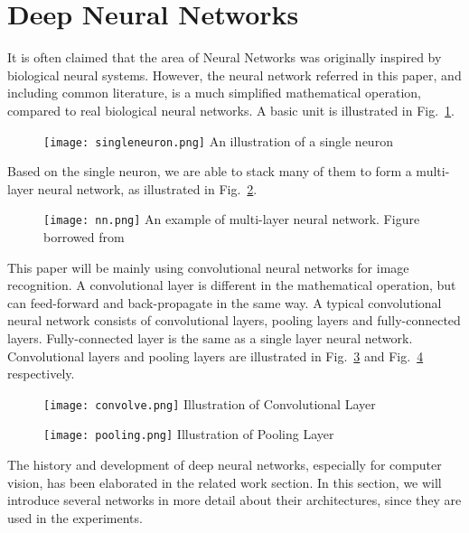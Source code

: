 \section{Deep Neural Networks}
It is often claimed that the area of Neural Networks was originally inspired by biological neural systems. However, the neural network referred in this paper, and including common literature, is a much simplified mathematical operation, compared to real biological neural networks. A basic unit is illustrated in Fig.~\ref{fig:singleneuron}.
\begin{figure}[!htp]
	\centering
	\texttt{[image: singleneuron.png]}
	{An illustration of a single neuron}
	\label{fig:singleneuron}
\end{figure}
Based on the single neuron, we are able to stack many of them to form a multi-layer neural network, as illustrated in Fig.~\ref{fig:nn}.
\begin{figure}[!htp]
	\centering
	\texttt{[image: nn.png]}
	{An example of multi-layer neural network. Figure borrowed from \parencite{lecun2015deep}}
	\label{fig:nn}
\end{figure}
This paper will be mainly using convolutional neural networks for image recognition. A convolutional layer is different in the mathematical operation, but can feed-forward and back-propagate in the same way. A typical convolutional neural network consists of convolutional layers, pooling layers and fully-connected layers. Fully-connected layer is the same as a single layer neural network. Convolutional layers and pooling layers are illustrated in Fig.~\ref{fig:convolve} and Fig.~\ref{fig:pooling} respectively. 
\begin{figure}[!htp]
	\centering
	\texttt{[image: convolve.png]}
	{Illustration of Convolutional Layer}
	\label{fig:convolve}
\end{figure}
\begin{figure}[!htp]
	\centering
	\texttt{[image: pooling.png]}
	{Illustration of Pooling Layer}
	\label{fig:pooling}
\end{figure}

The history and development of deep neural networks, especially for computer vision, has been elaborated in the related work section. In this section, we will introduce several networks in more detail about their architectures, since they are used in the experiments.

